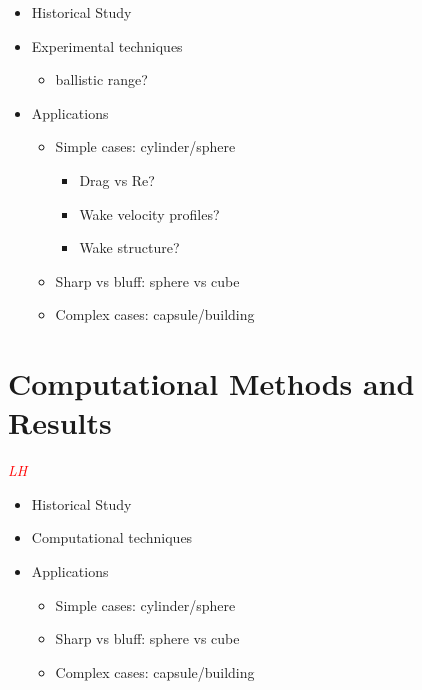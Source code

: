 \documentclass[journal]{new-aiaa}
\begin{document}
\begin{itemize}
    \item Historical Study
    \item Experimental techniques
    \begin{itemize}
        \item ballistic range?
    \end{itemize}
    \item Applications
    \begin{itemize}
        \item Simple cases: cylinder/sphere
        \begin{itemize}
            \item Drag vs Re?
            \item Wake velocity profiles?
            \item Wake structure?
        \end{itemize}
        \item Sharp vs bluff: sphere vs cube
        \item Complex cases: capsule/building
    \end{itemize}
\end{itemize}








\section{Computational Methods and Results} \label{sec:computationalmethods}

\textcolor{red}{\emph{LH}}

\begin{itemize}
    \item Historical Study
    \item Computational techniques
    \item Applications
    \begin{itemize}
        \item Simple cases: cylinder/sphere
        \item Sharp vs bluff: sphere vs cube
        \item Complex cases: capsule/building
    \end{itemize}
\end{itemize}
\end{document}

